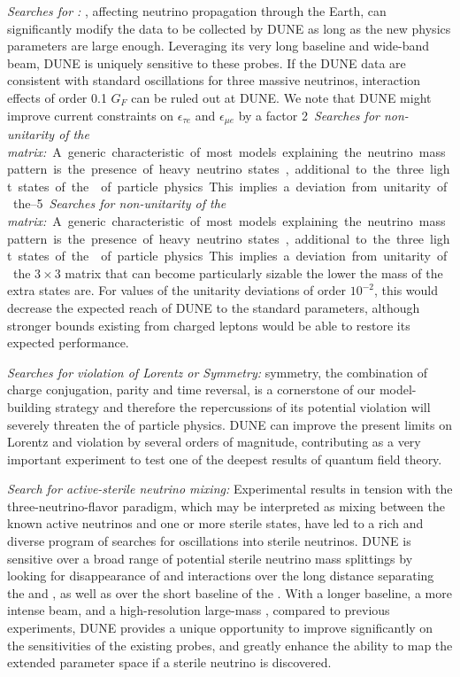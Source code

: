 \textit{Searches for :} %
, affecting neutrino propagation through the Earth, can significantly modify the data to be collected by DUNE as long as the new physics parameters are large enough. Leveraging its very long baseline and wide-band beam, DUNE is uniquely sensitive to these probes. If the DUNE data are consistent with standard oscillations for three massive neutrinos, interaction effects of order 0.1 $G_{F}$ can be ruled out at DUNE. We note that DUNE might improve current constraints on $\epsilon_{\tau e}$ and $\epsilon_{\mu e}$ by a factor \SIrange{2}{5}.

\textit{Searches for non-unitarity of the  matrix:} A generic characteristic of most models explaining the neutrino mass pattern is the presence of heavy neutrino states, additional to the three light states of the  of particle physics. This implies a deviation from %
unitarity of the $3 \times 3$  matrix that can %
become particularly sizable the lower the mass of the extra states are.  For values of the unitarity deviations of order $10^{-2}$, this would decrease the expected reach of DUNE to the standard parameters, although stronger bounds existing from charged leptons would be able to restore its expected performance.

\textit{Searches for violation of Lorentz or  Symmetry:}  symmetry, the combination of charge conjugation, parity and time reversal, is a cornerstone of our model-building strategy and therefore the repercussions of its potential violation will severely threaten the  of particle physics. DUNE can improve the present limits on Lorentz and  violation by several orders of magnitude, contributing as a very important experiment to test one of the deepest results of quantum field theory.

\textit{Search for active-sterile neutrino mixing:} Experimental results in tension with the three-neutrino-flavor paradigm, which may be interpreted as mixing between the known active neutrinos and one or more sterile states, have led to a rich and diverse program of searches for oscillations into sterile neutrinos. DUNE is sensitive over a broad range of potential sterile neutrino mass splittings by looking for disappearance of  and   interactions over the long distance separating the  and , as well as over the short baseline of the  . With a longer baseline, a more intense beam, and a high-resolution large-mass , compared to previous experiments, DUNE provides a unique opportunity to improve significantly on the sensitivities of the existing probes, and greatly enhance the ability to map the extended parameter space if a sterile neutrino is discovered.

